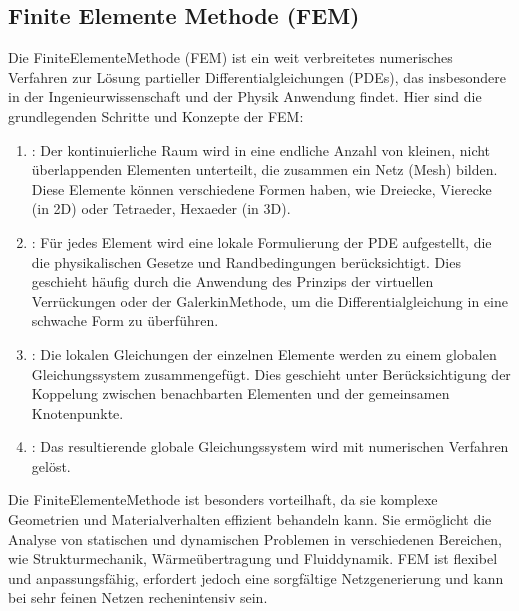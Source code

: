 \documentclass[letterpaper,10pt,german]{jupyterBook}
\begin{document}
\subsection{Finite Elemente Methode (FEM)}
\label{\detokenize{chapters/chapter1/Einf_xfchrung_Loesungsverfahren:finite-elemente-methode-fem}}
\sphinxAtStartPar
Die Finite\sphinxhyphen{}Elemente\sphinxhyphen{}Methode (FEM) ist ein weit verbreitetes numerisches Verfahren zur Lösung partieller Differentialgleichungen (PDEs), das insbesondere in der Ingenieurwissenschaft und der Physik Anwendung findet. Hier sind die grundlegenden Schritte und Konzepte der FEM:
\begin{enumerate}
%
\item {} 
\sphinxAtStartPar
{}: Der kontinuierliche Raum wird in eine endliche Anzahl von kleinen, nicht überlappenden Elementen unterteilt, die zusammen ein Netz (Mesh) bilden. Diese Elemente können verschiedene Formen haben, wie Dreiecke, Vierecke (in 2D) oder Tetraeder, Hexaeder (in 3D).

\item {} 
\sphinxAtStartPar
{}: Für jedes Element wird eine lokale Formulierung der PDE aufgestellt, die die physikalischen Gesetze und Randbedingungen berücksichtigt. Dies geschieht häufig durch die Anwendung des Prinzips der virtuellen Verrückungen oder der Galerkin\sphinxhyphen{}Methode, um die Differentialgleichung in eine schwache Form zu überführen.

\item {} 
\sphinxAtStartPar
{}: Die lokalen Gleichungen der einzelnen Elemente werden zu einem globalen Gleichungssystem zusammengefügt. Dies geschieht unter Berücksichtigung der Koppelung zwischen benachbarten Elementen und der gemeinsamen Knotenpunkte.

\item {} 
\sphinxAtStartPar
{}: Das resultierende globale Gleichungssystem wird mit numerischen Verfahren gelöst.

\end{enumerate}

\sphinxAtStartPar
Die Finite\sphinxhyphen{}Elemente\sphinxhyphen{}Methode ist besonders vorteilhaft, da sie komplexe Geometrien und Materialverhalten effizient behandeln kann. Sie ermöglicht die Analyse von statischen und dynamischen Problemen in verschiedenen Bereichen, wie Strukturmechanik, Wärmeübertragung und Fluiddynamik. FEM ist flexibel und anpassungsfähig, erfordert jedoch eine sorgfältige Netzgenerierung und kann bei sehr feinen Netzen rechenintensiv sein.
\end{document}
